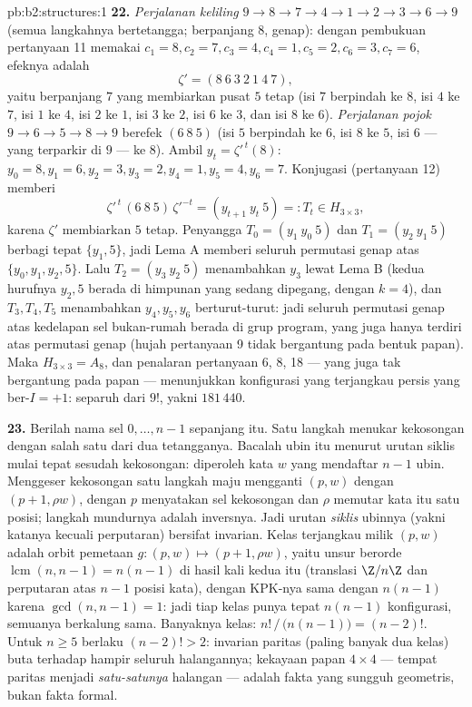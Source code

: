 \begin{solution}{pb:b2:structures:1}
\textbf{22.} \emph{Perjalanan keliling} $9 \to 8 \to 7 \to 4 \to 1
\to 2 \to 3 \to 6 \to 9$ (semua langkahnya bertetangga; berpanjang $8$,
genap): dengan pembukuan pertanyaan 11 memakai $c_1 = 8, c_2 = 7, c_3 =
4, c_4 = 1, c_5 = 2, c_6 = 3, c_7 = 6$, efeknya adalah
\[
\zeta' = (8\ 6\ 3\ 2\ 1\ 4\ 7),
\]
yaitu  berpanjang $7$ yang membiarkan pusat $5$ tetap (isi $7$
berpindah ke $8$, isi $4$ ke $7$, isi $1$ ke $4$, isi $2$ ke $1$, isi
$3$ ke $2$, isi $6$ ke $3$, dan isi $8$ ke $6$). \emph{Perjalanan pojok}
$9 \to 6 \to 5 \to 8 \to 9$ berefek $(6\ 8\ 5)$ (isi $5$ berpindah ke
$6$, isi $8$ ke $5$, isi $6$ --- yang terparkir di $9$ --- ke $8$).
Ambil $y_t = \zeta'^{\,t}(8)$: $y_0 = 8, y_1 = 6, y_2 = 3, y_3 = 2,
y_4 = 1, y_5 = 4, y_6 = 7$. Konjugasi (pertanyaan 12) memberi
\[
\zeta'^{\,t}\,(6\ 8\ 5)\,\zeta'^{-t}
= (y_{t+1}\ y_t\ 5) =: T_t \in H_{3\times3},
\]
karena $\zeta'$ membiarkan $5$ tetap. Penyangga $T_0 = (y_1\ y_0\ 5)$
dan $T_1 = (y_2\ y_1\ 5)$ berbagi tepat $\{y_1, 5\}$, jadi Lema A
memberi seluruh permutasi genap atas $\{y_0, y_1, y_2, 5\}$. Lalu
$T_2 = (y_3\ y_2\ 5)$ menambahkan $y_3$ lewat Lema B (kedua hurufnya
$y_2, 5$ berada di himpunan yang sedang dipegang, dengan $k = 4$), dan
$T_3, T_4, T_5$ menambahkan $y_4, y_5, y_6$ berturut-turut: jadi seluruh
permutasi genap atas kedelapan sel bukan-rumah berada di grup program,
yang juga hanya terdiri atas permutasi genap (hujah pertanyaan 9 tidak
bergantung pada bentuk papan). Maka $H_{3\times3} = A_8$, dan penalaran
pertanyaan 6, 8, 18 --- yang juga tak bergantung pada papan ---
menunjukkan konfigurasi yang terjangkau persis yang ber-$I = +1$:
separuh dari $9!$, yakni $181\,440$.

\textbf{23.} Berilah nama sel $0, \dots, n-1$ sepanjang  itu.
Satu langkah menukar kekosongan dengan salah satu dari dua tetangganya.
Bacalah ubin itu menurut urutan siklis mulai tepat sesudah kekosongan:
diperoleh kata $w$ yang mendaftar $n - 1$ ubin. Menggeser kekosongan
satu langkah maju mengganti $(p, w)$ dengan $(p + 1, \rho w)$, dengan
$p$ menyatakan sel kekosongan dan $\rho$ memutar kata itu satu posisi;
langkah mundurnya adalah inversnya. Jadi urutan \emph{siklis} ubinnya
(yakni katanya kecuali perputaran) bersifat invarian. Kelas terjangkau
milik $(p, w)$ adalah orbit pemetaan $g \colon (p, w) \mapsto (p+1,
\rho w)$, yaitu unsur berorde $\operatorname{lcm}(n, n-1) =
n(n-1)$ di hasil kali kedua  itu (translasi
$\Z/n\Z$ dan perputaran atas $n-1$ posisi kata), dengan KPK-nya
sama dengan $n(n-1)$ karena $\gcd(n, n-1) = 1$: jadi tiap kelas punya
tepat $n(n-1)$ konfigurasi, semuanya berkalung sama.
Banyaknya kelas: $n!\,/\,\bigl(n(n-1)\bigr) = (n-2)!$. Untuk $n \geq 5$
berlaku $(n-2)! > 2$: invarian paritas (paling banyak dua kelas) buta
terhadap hampir seluruh halangannya; kekayaan papan $4
\times 4$ --- tempat paritas menjadi \emph{satu-satunya} halangan ---
adalah fakta yang sungguh geometris, bukan fakta formal.


\end{solution}
